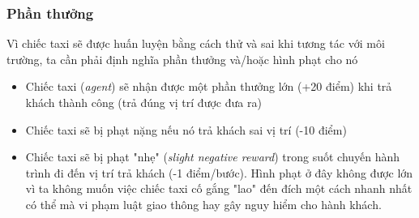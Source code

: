 \documentclass[12pt,a4paper]{report}
\begin{document}
\subsubsection{Phần thưởng}
Vì chiếc taxi sẽ được huấn luyện bằng cách thử và sai khi tương tác với môi trường, ta
cần phải định nghĩa phần thưởng và/hoặc hình phạt cho nó
\begin{itemize}
	\item Chiếc taxi (\textit{agent}) sẽ nhận được một phần thưởng lớn (+20 điểm) khi trả khách thành
	công (trả đúng vị trí được đưa ra)
	\item Chiếc taxi sẽ bị phạt nặng nếu nó trả khách sai vị trí (-10 điểm)
	\item Chiếc taxi sẽ bị phạt "nhẹ" (\textit{slight negative reward}) trong suốt chuyến hành trình đi
	đến vị trí trả khách (-1 điểm/bước). Hình phạt ở đây không được lớn vì ta không muốn
	việc chiếc taxi cố gắng "lao" đến đích một cách nhanh nhất có thể mà vi phạm luật
	giao thông hay gây nguy hiểm cho hành khách.
\end{itemize}
\end{document}
